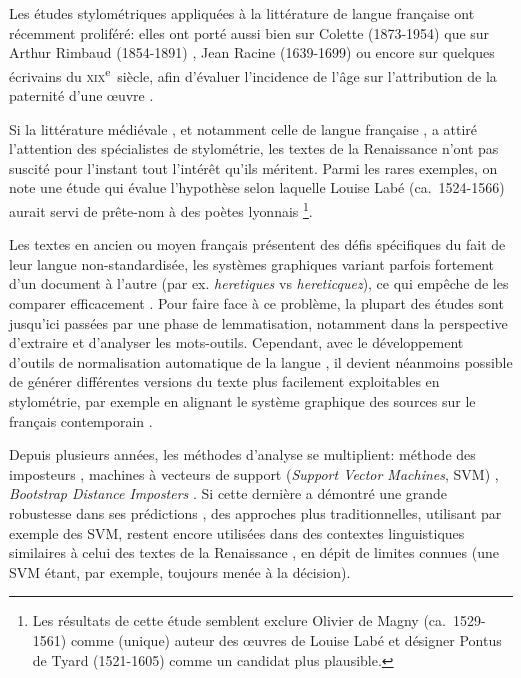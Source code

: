 \documentclass[final, fra]{anthology-ch}
\begin{document}
Les études stylométriques appliquées à la littérature de langue française ont récemment proliféré: elles ont porté aussi bien sur Colette (1873-1954) \cite{cafiero2022colette} que sur Arthur Rimbaud (1854-1891) \cite{gabay2025rimbaud}, Jean Racine (1639-1699) \cite{gabay2021racine} ou encore sur quelques écrivains du \textsc{xix}\textsuperscript{e}~siècle, afin d'évaluer l'incidence de l'âge sur l'attribution de la paternité d'une œuvre \cite{cafiero2025age}. 

Si la littérature médiévale \cite{kestemont2015collaborative}, et notamment celle de langue française \cite{camps2021medievaldata, camps2025style,clerice_wauchier_2025}, a attiré l'attention des spécialistes de stylométrie, les textes de la Renaissance n'ont pas suscité pour l'instant tout l'intérêt qu'ils méritent. Parmi les rares exemples, on note une étude qui évalue l'hypothèse selon laquelle Louise Labé (ca.~1524-1566) aurait servi de prête-nom à des poètes lyonnais \cite{cafiero2023labe}\footnote{Les résultats de cette étude semblent exclure Olivier de Magny (ca.~1529-1561) comme (unique) auteur des œuvres de Louise Labé et désigner Pontus de Tyard (1521-1605) comme un candidat plus plausible.}. 

Les textes en ancien ou moyen français présentent des défis spécifiques du fait de leur langue non-standardisée, les systèmes graphiques variant parfois fortement d'un document à l'autre (par ex. \textit{heretiques} vs \textit{hereticquez}), ce qui empêche de les comparer efficacement \cite{camps2021medievaldata, cafiero2023labe}. Pour faire face à ce problème, la plupart des études sont jusqu'ici passées par une phase de lemmatisation, notamment dans la perspective d'extraire et d'analyser les mots-outils. Cependant, avec le développement d'outils de normalisation automatique de la langue \cite{bawden_automatic_2022,rubino2024normalizing,solfrini2025normaliser}, il devient néanmoins possible de générer différentes versions du texte plus facilement exploitables en stylométrie, par exemple en alignant le système graphique des sources sur le français contemporain \cite{gabay2021racine}.

Depuis plusieurs années, les méthodes d'analyse se multiplient: méthode des imposteurs \cite{seidman2013authorship}, machines à vecteurs de support (\textit{Support Vector Machines}, SVM) \cite{cafiero2021theatre}, \textit{Bootstrap Distance Imposters} \cite{nagy2024bootstrap}. Si cette dernière a démontré une grande robustesse dans ses prédictions \cite{cafiero2025age}, des approches plus traditionnelles, utilisant par exemple des SVM, restent encore utilisées dans des contextes linguistiques similaires à celui des textes de la Renaissance \cite{camps2025style}, en dépit de limites connues (une SVM étant, par exemple, toujours menée à la décision).
\end{document}
